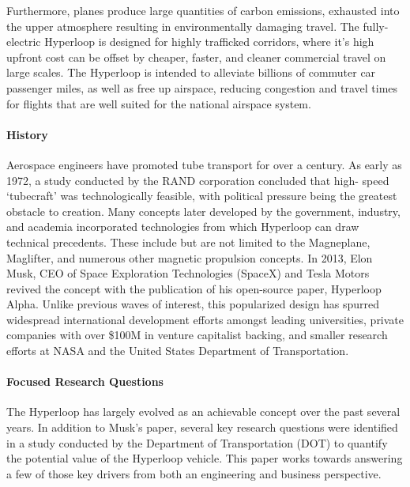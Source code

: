 	Furthermore, planes produce large quantities of carbon emissions,
	exhausted into the upper atmosphere resulting in environmentally damaging travel.
	The fully-electric Hyperloop is designed for highly trafficked corridors,
	where it's high upfront cost can be offset by cheaper, faster, and cleaner
	commercial travel on large scales.
	The Hyperloop is intended to alleviate billions of commuter car passenger miles,
	as well as free up airspace, reducing congestion and travel times for
	flights that are well suited for the national airspace system.\\

\paragraph{History}

	Aerospace engineers have promoted tube transport for over a century.
	As early as 1972, a study conducted by the RAND corporation concluded that high-
	speed `tubecraft' was technologically feasible, with political pressure being the greatest
	obstacle to creation.\cite{RAND} Many concepts later developed by
	the government, industry, and academia incorporated technologies from which
	Hyperloop can draw technical precedents.
	These include but are not limited to the Magneplane, Maglifter, and numerous
	other magnetic propulsion concepts. In 2013, Elon Musk, CEO of Space Exploration
	Technologies (SpaceX) and Tesla Motors revived the concept with the publication
	of his open-source paper, Hyperloop Alpha.\cite{Musk}
	Unlike previous waves of interest, this popularized design has spurred widespread international
	development efforts amongst leading universities, private companies with over
	\$100M in venture capitalist backing, and smaller research efforts at NASA and the
	United States Department of Transportation. \cite{Chin}

\paragraph{Focused Research Questions}

	The Hyperloop has largely evolved as an achievable concept over the past several years.
	In addition to Musk's paper, several key research questions were identified in a study conducted
	by the Department of Transportation (DOT) to quantify the potential value of the
	Hyperloop vehicle. \cite{Volpe} This paper works towards answering a few of
	those key drivers from both an engineering and business perspective.

